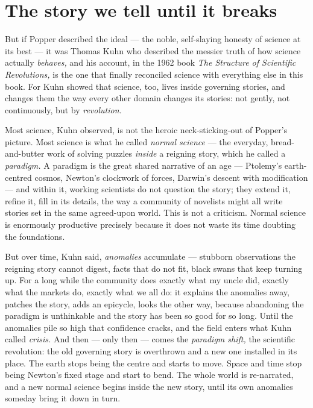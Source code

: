 \section*{The story we tell until it breaks}

But if Popper described the ideal — the noble, self-slaying honesty of science at its best — it was Thomas Kuhn who described the messier truth of how science actually \emph{behaves,} and his account, in the 1962 book \emph{The Structure of Scientific Revolutions,} is the one that finally reconciled science with everything else in this book. For Kuhn showed that science, too, lives inside governing stories, and changes them the way every other domain changes its stories: not gently, not continuously, but by \emph{revolution.}

Most science, Kuhn observed, is not the heroic neck-sticking-out of Popper's picture. Most science is what he called \emph{normal science} — the everyday, bread-and-butter work of solving puzzles \emph{inside} a reigning story, which he called a \emph{paradigm.} A paradigm is the great shared narrative of an age — Ptolemy's earth-centred cosmos, Newton's clockwork of forces, Darwin's descent with modification — and within it, working scientists do not question the story; they extend it, refine it, fill in its details, the way a community of novelists might all write stories set in the same agreed-upon world. This is not a criticism. Normal science is enormously productive precisely because it does not waste its time doubting the foundations.

But over time, Kuhn said, \emph{anomalies} accumulate — stubborn observations the reigning story cannot digest, facts that do not fit, black swans that keep turning up. For a long while the community does exactly what my uncle did, exactly what the markets do, exactly what we all do: it explains the anomalies away, patches the story, adds an epicycle, looks the other way, because abandoning the paradigm is unthinkable and the story has been so good for so long. Until the anomalies pile so high that confidence cracks, and the field enters what Kuhn called \emph{crisis.} And then — only then — comes the \emph{paradigm shift,} the scientific revolution: the old governing story is overthrown and a new one installed in its place. The earth stops being the centre and starts to move. Space and time stop being Newton's fixed stage and start to bend. The whole world is re-narrated, and a new normal science begins inside the new story, until its own anomalies someday bring it down in turn.


